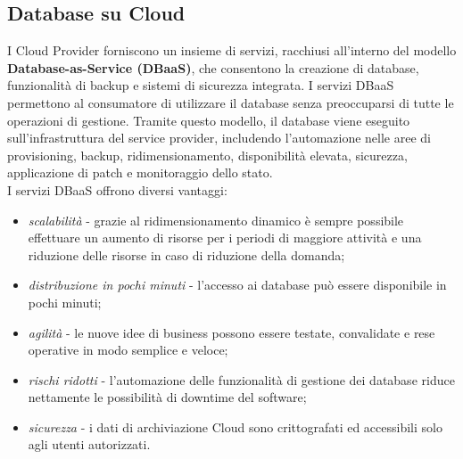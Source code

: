 \subsection{Database su Cloud}
I Cloud Provider forniscono un insieme di servizi, racchiusi all'interno del modello \textbf{Database-as-Service (DBaaS)}, che consentono la creazione di database, funzionalità di backup e sistemi di sicurezza integrata. I servizi DBaaS permettono al consumatore di utilizzare il database senza preoccuparsi di tutte le operazioni di gestione. Tramite questo modello, il database viene eseguito sull'infrastruttura del service provider, includendo l'automazione nelle aree di provisioning, backup, ridimensionamento, disponibilità elevata, sicurezza, applicazione di patch e monitoraggio dello stato. \\
I servizi DBaaS offrono diversi vantaggi:
\begin{itemize}
    \item \textit{scalabilità} - grazie al ridimensionamento dinamico è sempre possibile effettuare un aumento di risorse per i periodi di maggiore attività e una riduzione delle risorse in caso di riduzione della domanda;
    \item \textit{distribuzione in pochi minuti} - l'accesso ai database può essere disponibile in pochi minuti;
    \item \textit{agilità} - le nuove idee di business possono essere testate, convalidate e rese operative in modo semplice e veloce;
    \item \textit{rischi ridotti} - l'automazione delle funzionalità di gestione dei database riduce nettamente le possibilità di downtime del software;
    \item \textit{sicurezza} - i dati di archiviazione Cloud sono crittografati ed accessibili solo agli utenti autorizzati.
\end{itemize}